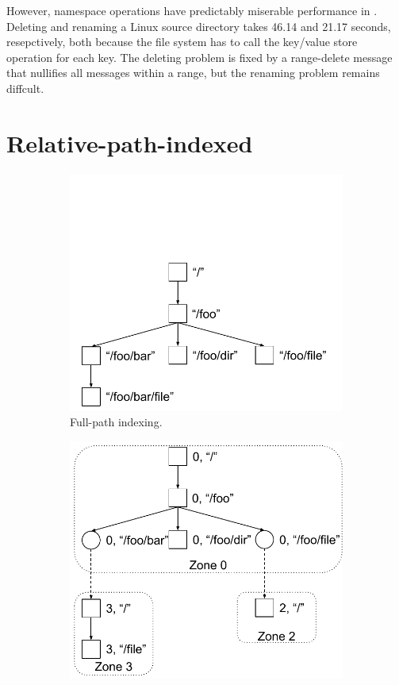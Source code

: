 However, namespace operations have predictably miserable performance in
\betrfsOne.
Deleting and renaming a Linux source directory takes 46.14 and 21.17 seconds,
resepctively, both because the file system has to call the key/value store
operation for each key.
The deleting problem is fixed by a range-delete message that nullifies all
messages within a range, but the renaming problem remains diffcult.

\section{Relative-path-indexed \betrfs}
\label{sec:rpi}

\begin{figure}
    \begin{subfigure}{.5\textwidth}
        \centering
        \includegraphics[width=.9\linewidth]{proposal/fig/FPI}
        \caption{\label{subfig:FPI} Full-path indexing.}
    \end{subfigure}
    \begin{subfigure}{.5\textwidth}
        \centering
        \includegraphics[width=.9\linewidth]{proposal/fig/RPI}

\end{subfigure}
\end{figure}
